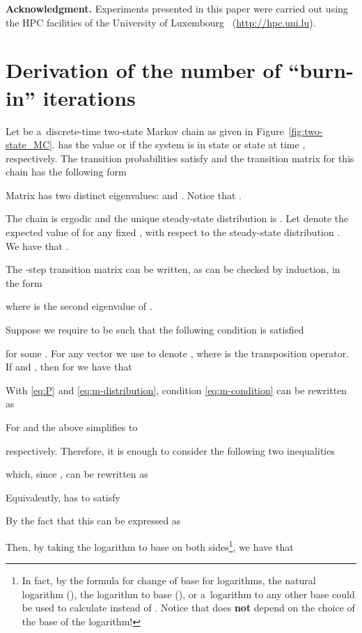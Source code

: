 \documentclass[runningheads,a4paper]{llncs}
\begin{document}
\medskip
\noindent
\textbf{Acknowledgment.}
Experiments presented in this paper were carried out using the HPC facilities of the University of Luxembourg~\cite{VBCG_HPCS14}
(\url{http://hpc.uni.lu}).




\newpage



\appendix

\section{Derivation of the number of ``burn-in'' iterations}
\label{app:m}
Let  be a~discrete-time two-state Markov chain as given in
Figure~\ref{fig:two-state_MC}.
 has the value  or  if the system is in state  or state  at time ,
respectively. The transition probabilities satisfy  and the transition matrix
for this chain has the following form

Matrix  has two distinct eigenvalues:  and . Notice that
.

The chain is ergodic and the unique steady-state distribution is .
Let  denote the expected value of  for any fixed , with respect
to the steady-state distribution . We have that
.

The -step transition matrix can be written, as can be checked by induction, in the form

where  is the second eigenvalue of .

Suppose we require  to be such that the following condition is satisfied

for some . For any vector  we use 
to denote , where  is the
transposition operator. If  and , then for  we have that

With \eqref{eq:P} and \eqref{eq:m-distribution}, condition \eqref{eq:m-condition} can be rewritten
as

For  and  the above simplifies to

respectively. Therefore, it is enough to consider the following two inequalities

which, since , can be rewritten as

Equivalently,  has to satisfy

By the fact that  this can be expressed as

Then, by taking the logarithm to base  on both sides\footnote{In fact, by the formula for
change of base for logarithms, the natural logarithm (), the logarithm to base 
(), or a~logarithm to any other base could be used to calculate  instead of .
Notice that  does \textbf{not} depend on the choice of the base of the logarithm!}, we have
that
\end{document}
